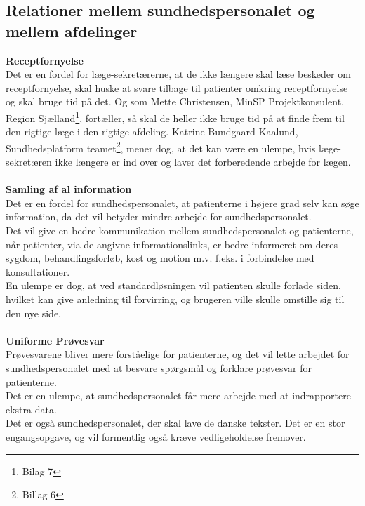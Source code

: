 \subsection{Relationer mellem sundhedspersonalet og mellem afdelinger}
\textbf{Receptfornyelse}\\
Det er en fordel for læge-sekretærerne, at de ikke længere skal læse beskeder om receptfornyelse, skal huske at svare tilbage til patienter omkring receptfornyelse og skal bruge tid på det. Og som Mette Christensen, MinSP Projektkonsulent, Region Sjælland\footnote{Bilag 7}, fortæller, så skal de heller ikke bruge tid på at finde frem til den rigtige læge i den rigtige afdeling. Katrine Bundgaard Kaalund, Sundhedsplatform teamet\footnote{Billag 6}, mener dog, at det kan være en ulempe, hvis læge-sekretæren ikke længere er ind over og laver det forberedende arbejde for lægen. 
\\\\
\textbf{Samling af al information}\\
Det er en fordel for sundhedspersonalet, at patienterne i højere grad selv kan søge information, da det vil betyder mindre arbejde for sundhedspersonalet.\\
Det vil give en bedre kommunikation mellem sundhedspersonalet og patienterne, når patienter, via de angivne informationslinks, er bedre informeret om deres sygdom, behandlingsforløb, kost og motion m.v. f.eks. i forbindelse med konsultationer.\\
En ulempe er dog, at ved standardløsningen vil patienten skulle forlade siden, hvilket kan give anledning til forvirring, og brugeren ville skulle omstille sig til den nye side. 
\\\\
\textbf{Uniforme Prøvesvar}\\
Prøvesvarene bliver mere forståelige for patienterne, og det vil lette arbejdet for sundhedspersonalet med at besvare spørgsmål og forklare prøvesvar for patienterne.\\
Det er en ulempe, at sundhedspersonalet får mere arbejde med at indrapportere ekstra data. \\
Det er også sundhedspersonalet, der skal lave de danske tekster. Det er en stor engangsopgave, og vil formentlig også kræve vedligeholdelse fremover.
